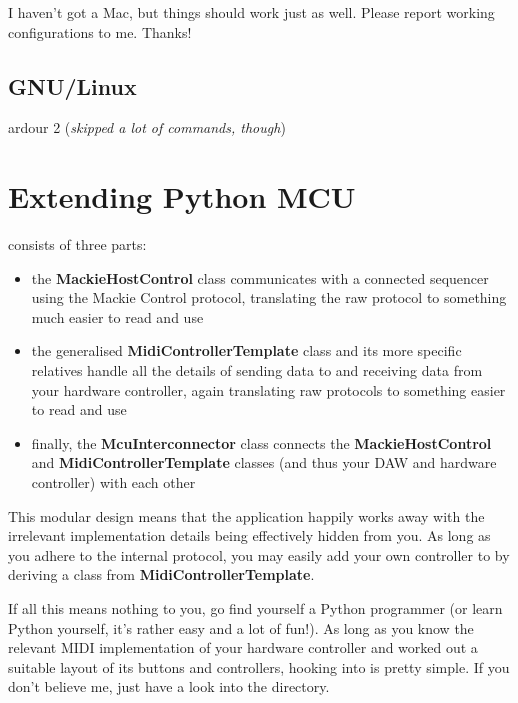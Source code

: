 I haven't got a Mac, but things should work just as well.  Please
report working configurations to me.  Thanks!

\section{GNU/Linux}

\begin{compactitem}
\item ardour 2 (\emph{skipped a lot of commands, though})
\end{compactitem}

\chapter{Extending Python MCU}
\label{chap:extending_python_mcu}

 consists of three parts:

\begin{itemize}

\item the \textbf{MackieHostControl} class communicates with a
  connected sequencer using the Mackie Control protocol, translating
  the raw protocol to something much easier to read and use

\item the generalised \textbf{MidiControllerTemplate} class and its
  more specific relatives handle all the details of sending data to
  and receiving data from your hardware controller, again translating
  raw protocols to something easier to read and use

\item finally, the \textbf{McuInterconnector} class connects the
  \textbf{MackieHostControl} and \textbf{MidiControllerTemplate}
  classes (and thus your DAW and hardware controller) with each other

\end{itemize}

This modular design means that the application happily works away with
the irrelevant implementation details being effectively hidden from
you.  As long as you adhere to the internal protocol, you may easily
add your own controller to  by deriving a
class from \textbf{MidiControllerTemplate}.

If all this means nothing to you, go find yourself a Python programmer
(or learn Python yourself, it's rather easy and a lot of fun!).  As
long as you know the relevant MIDI implementation of your hardware
controller and worked out a suitable layout of its buttons and
controllers, hooking into  is pretty simple.
If you don't believe me, just have a look into the 
directory.






